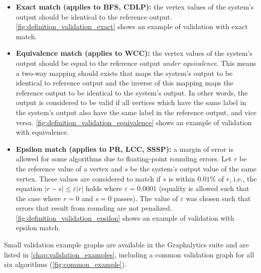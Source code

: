\begin{itemize}

\item \textbf{Exact match (applies to BFS, CDLP):} the vertex values of the system's output should be identical to the reference output. \autoref{fig:definition_validation_exact} shows an example of validation with exact match.

\item \textbf{Equivalence match (applies to WCC):} the vertex values of the system's output should be equal to the reference output \emph{under equivalence}. This means a two-way mapping should exists that maps the system's output to be identical to reference output and the inverse of this mapping maps the reference output to be identical to the system's output. In other words, the output is considered to be valid if all vertices which have the same label in the system's output also have the same label in the reference output, and vice versa. \autoref{fig:definition_validation_equivalence} shows an example of validation with equivalence.

\item \textbf{Epsilon match (applies to PR, LCC, SSSP):} a margin of error is allowed for some algorithms due to floating-point rounding errors. Let $r$ be the reference value of a vertex and $s$ be the system's output value of the same vertex. These values are considered to match if $s$ is within $0.01\%$ of $r$, i.e., the equation $|r-s| \leq \varepsilon |r|$ holds where $\varepsilon=0.0001$ (equality is allowed such that the case where $r = 0$ and $s = 0$ passes). The value of $\varepsilon$ was chosen such that errors that result from rounding are not penalized. \autoref{fig:definition_validation_epsilon} shows an example of validation with epsilon match.
\end{itemize}

Small validation example graphs are available in the Graphalytics suite and are listed in \autoref{chap:validation_examples}, including a common validation graph for all six algorithms (\autoref{fig:common_example}).












